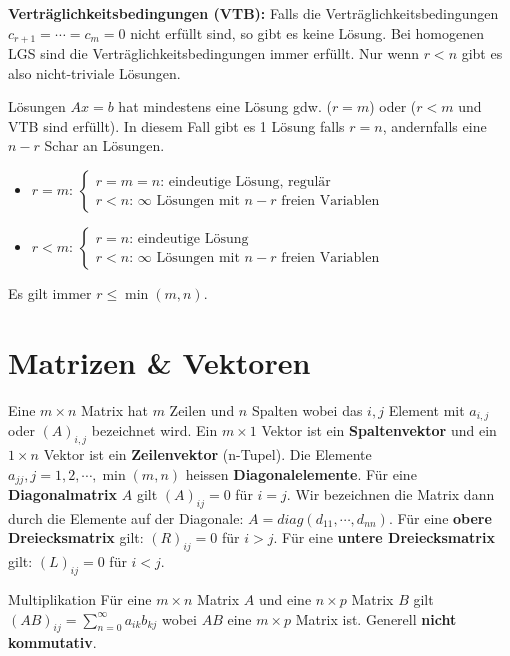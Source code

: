 \documentclass[a4paper,10pt]{article}
\def\sumn{\sum_{n=0}^\infty}
\begin{document}
\textbf{Verträglichkeitsbedingungen (VTB):} Falls die Verträglichkeitsbedingungen $c_{r+1} = \cdots = c_m = 0$ nicht erfüllt sind, so gibt es keine Lösung. Bei homogenen LGS sind die Verträglichkeitsbedingungen immer erfüllt. Nur wenn $r < n$ gibt es also nicht-triviale Lösungen.\\

\begin{subbox}{Lösungen}
  $Ax = b$ hat mindestens eine Lösung gdw. ($r = m$) oder ($r < m$ und VTB sind erfüllt). In diesem Fall gibt es 1 Lösung falls $r = n$, andernfalls eine $n - r$ Schar an Lösungen.
  \begin{itemize}
    \item $r = m$: $\begin{cases}
      r = m = n\text{: eindeutige Lösung, regulär}\\
      r < n\text{: }\infty\text{ Lösungen mit } n - r \text{ freien Variablen}
    \end{cases}$\\
    \item $r < m$: $\begin{cases}
      r = n\text{: eindeutige Lösung}\\
      r < n\text{: }\infty\text{ Lösungen mit } n - r \text{ freien Variablen}
    \end{cases}$
  \end{itemize}
\end{subbox}

Es gilt immer $r \leq \min(m, n)$.

\section{Matrizen \& Vektoren}

Eine $m \times n$ Matrix hat $m$ Zeilen und $n$ Spalten wobei das $i,j$ Element mit $a_{i,j}$ oder $(A)_{i,j}$ bezeichnet wird. Ein $m \times 1$ Vektor ist ein \textbf{Spaltenvektor} und ein $1 \times n$ Vektor ist ein \textbf{Zeilenvektor} (n-Tupel). Die Elemente $a_{jj}, j = 1,2,\cdots,\min(m,n)$ heissen \textbf{Diagonalelemente}. Für eine \textbf{Diagonalmatrix} $A$ gilt $(A)_{ij} = 0$ für $i = j$. Wir bezeichnen die Matrix dann durch die Elemente auf der Diagonale: $A = diag(d_{11}, \cdots, d_{nn})$. Für eine \textbf{obere Dreiecksmatrix} gilt: $(R)_{ij} = 0$ für $i > j$. Für eine \textbf{untere Dreiecksmatrix} gilt: $(L)_{ij} = 0$ für $i < j$.

\begin{subbox}{Multiplikation}
  Für eine $m \times n$ Matrix $A$ und eine $n \times p$ Matrix $B$ gilt $(AB)_{ij} = \sumn a_{ik} b_{kj}$ wobei $AB$ eine $m \times p$ Matrix ist. Generell \textbf{nicht kommutativ}.
\end{subbox}
\end{document}
